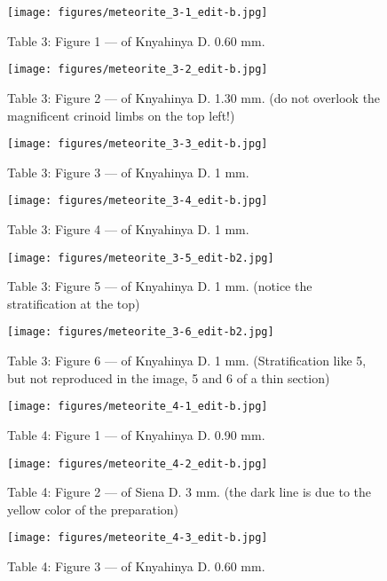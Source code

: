 \documentclass[a4paper, 12pt, oneside]{article}
\begin{document}
\clearpage
\begin{figure}[t]
\texttt{[image: figures/meteorite\_3-1\_edit-b.jpg]}
\caption{Table 3: Figure 1 --- of Knyahinya D. 0.60 mm.}
\centering
\end{figure}
\clearpage
\begin{figure}[t]
\texttt{[image: figures/meteorite\_3-2\_edit-b.jpg]}
\caption{Table 3: Figure 2 --- of Knyahinya D. 1.30 mm. (do not overlook the magnificent crinoid limbs on the top left!)}
\centering
\end{figure}
\clearpage
\begin{figure}[t]
\texttt{[image: figures/meteorite\_3-3\_edit-b.jpg]}
\caption{Table 3: Figure 3 --- of Knyahinya D. 1 mm.}
\centering
\end{figure}
\clearpage
\begin{figure}[t]
\texttt{[image: figures/meteorite\_3-4\_edit-b.jpg]}
\caption{Table 3: Figure 4 --- of Knyahinya D. 1 mm.}
\centering
\end{figure}
\clearpage
\begin{figure}[t]
\texttt{[image: figures/meteorite\_3-5\_edit-b2.jpg]}
\caption{Table 3: Figure 5 --- of Knyahinya D. 1 mm. (notice the stratification at the top)}
\centering
\end{figure}
\clearpage
\begin{figure}[t]
\texttt{[image: figures/meteorite\_3-6\_edit-b2.jpg]}
\caption{Table 3: Figure 6 --- of Knyahinya D. 1 mm. (Stratification like 5, but not reproduced in the image, 5 and 6 of a thin section)}
\centering
\end{figure}
\clearpage
\begin{figure}[t]
\texttt{[image: figures/meteorite\_4-1\_edit-b.jpg]}
\caption{Table 4: Figure 1 --- of Knyahinya D. 0.90 mm.}
\centering
\end{figure}
\clearpage
\begin{figure}[t]
\texttt{[image: figures/meteorite\_4-2\_edit-b.jpg]}
\caption{Table 4: Figure 2 --- of Siena D. 3 mm. (the dark line is due to the yellow color of the preparation)}
\centering
\end{figure}
\clearpage
\begin{figure}[t]
\texttt{[image: figures/meteorite\_4-3\_edit-b.jpg]}
\caption{Table 4: Figure 3 --- of Knyahinya D. 0.60 mm.}
\centering
\end{figure}
\end{document}
